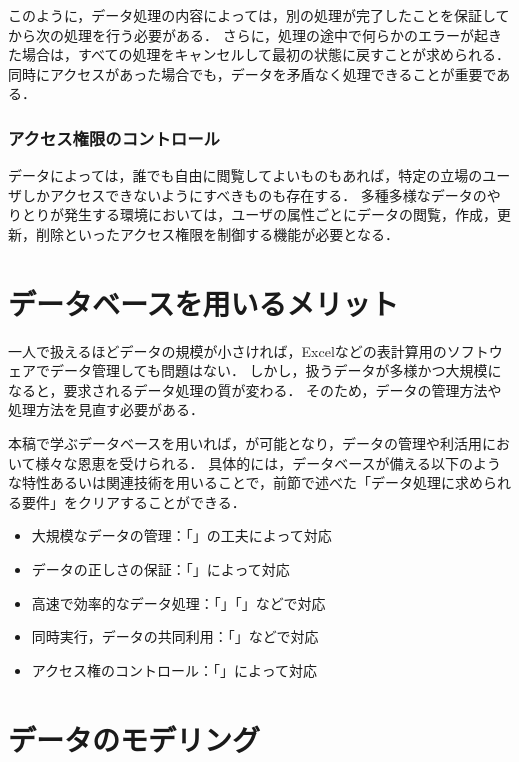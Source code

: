 このように，データ処理の内容によっては，別の処理が完了したことを保証してから次の処理を行う必要がある．
さらに，処理の途中で何らかのエラーが起きた場合は，すべての処理をキャンセルして最初の状態に戻すことが求められる．
同時にアクセスがあった場合でも，データを矛盾なく処理できることが重要である．


\subsubsection{アクセス権限のコントロール}
データによっては，誰でも自由に閲覧してよいものもあれば，特定の立場のユーザしかアクセスできないようにすべきものも存在する．
多種多様なデータのやりとりが発生する環境においては，ユーザの属性ごとにデータの閲覧，作成，更新，削除といったアクセス権限を制御する機能が必要となる．


\section{データベースを用いるメリット}
一人で扱えるほどデータの規模が小さければ，Excelなどの表計算用のソフトウェアでデータ管理しても問題はない．
しかし，扱うデータが多様かつ大規模になると，要求されるデータ処理の質が変わる．
そのため，データの管理方法や処理方法を見直す必要がある．

本稿で学ぶデータベースを用いれば，が可能となり，データの管理や利活用において様々な恩恵を受けられる．
具体的には，データベースが備える以下のような特性あるいは関連技術を用いることで，前節で述べた「データ処理に求められる要件」をクリアすることができる．
\begin{itemize}
\item 大規模なデータの管理：「」の工夫によって対応
\item データの正しさの保証：「」によって対応
\item 高速で効率的なデータ処理：「」「」などで対応
\item 同時実行，データの共同利用：「」などで対応
\item アクセス権のコントロール：「」によって対応
\end{itemize}


\section{データのモデリング}
